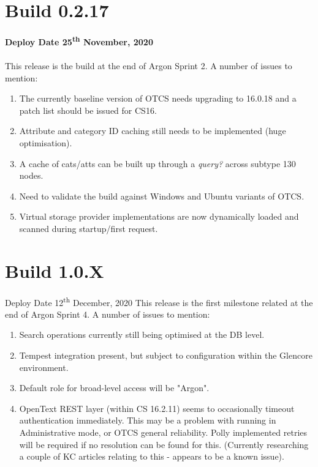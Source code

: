 \documentclass{book}
\begin{document}
\section{Build 0.2.17}
\textbf{Deploy Date 25\textsuperscript{th} November, 2020}
\paragraph{}
This release is the build at the end of Argon Sprint 2.  A number of issues to mention:
\begin{enumerate}
    \item The currently baseline version of OTCS needs upgrading to 16.0.18 and a patch list should be issued for CS16.
    \item Attribute and category ID caching still needs to be implemented (huge optimisation).
    \item A cache of cats/atts can be built up through a \textit{query?} across subtype 130 nodes.
    \item Need to validate the build against Windows and Ubuntu variants of OTCS.
    \item Virtual storage provider implementations are now dynamically loaded and scanned during startup/first request.
\end{enumerate}
\section{Build 1.0.X}
Deploy Date 12\textsuperscript{th} December, 2020
This release is the first milestone related at the end of Argon Sprint 4.  A number of issues to mention:
\begin{enumerate}
    \item Search operations currently still being optimised at the DB level.
    \item Tempest integration present, but subject to configuration within the Glencore environment.
    \item Default role for broad-level access will be "Argon".
    \item OpenText REST layer (within CS 16.2.11) seems to occasionally timeout authentication immediately.  This may be a problem with running in Administrative mode, or OTCS general reliability.  Polly implemented retries will be required if no resolution can be found for this.  (Currently researching a couple of KC articles relating to this - appears to be a known issue).
\end{enumerate}
\end{document}
